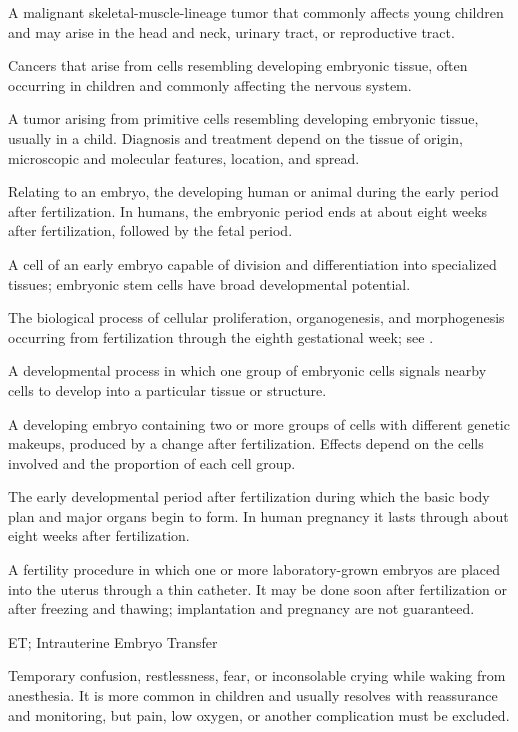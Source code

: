  A malignant skeletal-muscle-lineage tumor that commonly affects young children and may arise in the head and neck, urinary tract, or reproductive tract.

 Cancers that arise from cells resembling developing embryonic tissue, often occurring in children and commonly affecting the nervous system.

 A tumor arising from primitive cells resembling developing embryonic tissue, usually in a child. Diagnosis and treatment depend on the tissue of origin, microscopic and molecular features, location, and spread.

 Relating to an embryo, the developing human or animal during the early period after fertilization. In humans, the embryonic period ends at about eight weeks after fertilization, followed by the fetal period.

 A cell of an early embryo capable of division and differentiation into specialized tissues; embryonic stem cells have broad developmental potential.

 The biological process of cellular proliferation, organogenesis, and morphogenesis occurring from fertilization through the eighth gestational week; see .

 A developmental process in which one group of embryonic cells signals nearby cells to develop into a particular tissue or structure.

 A developing embryo containing two or more groups of cells with different genetic makeups, produced by a change after fertilization. Effects depend on the cells involved and the proportion of each cell group.

 The early developmental period after fertilization during which the basic body plan and major organs begin to form. In human pregnancy it lasts through about eight weeks after fertilization.

 A fertility procedure in which one or more laboratory-grown embryos are placed into the uterus through a thin catheter. It may be done soon after fertilization or after freezing and thawing; implantation and pregnancy are not guaranteed.

\synonyms
ET; Intrauterine Embryo Transfer

 Temporary confusion, restlessness, fear, or inconsolable crying while waking from anesthesia. It is more common in children and usually resolves with reassurance and monitoring, but pain, low oxygen, or another complication must be excluded.

